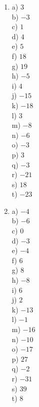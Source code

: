 \documentclass{exam}
\begin{document}
\begin{multicols*}{4}
\begin{enumerate}
\item 	a) $3$ \\
		b) $-3$ \\
		c) $1$ \\
		d) $4$ \\
		e) $5$ \\
		f) $18$ \\
		g) $19$ \\
		h) $-5$ \\
		i) $4$ \\
		j) $-15$ \\
		k) $-18$ \\
		l) $3$ \\
		m) $-8$ \\
		n) $-6$ \\
		o) $-3$ \\
		p) $3$ \\
		q) $-3$ \\
		r) $-21$ \\
		s) $18$ \\
		t) $-23$ \\

\item 	a) $-4$ \\
		b) $-6$ \\
		c) $0$ \\
		d) $-3$ \\
		e) $-4$ \\
		f) $6$ \\
		g) $8$ \\
		h) $-8$ \\
		i) $6$ \\
		j) $2$ \\
		k) $-13$ \\
		l) $-1$ \\
		m) $-16$ \\
		n) $-10$ \\
		o) $-17$ \\
		p) $27$ \\
		q) $-2$ \\
		r) $-31$ \\
		s) $39$ \\
		t) $8$ \\



\end{enumerate}
\end{multicols*}
\end{document}
